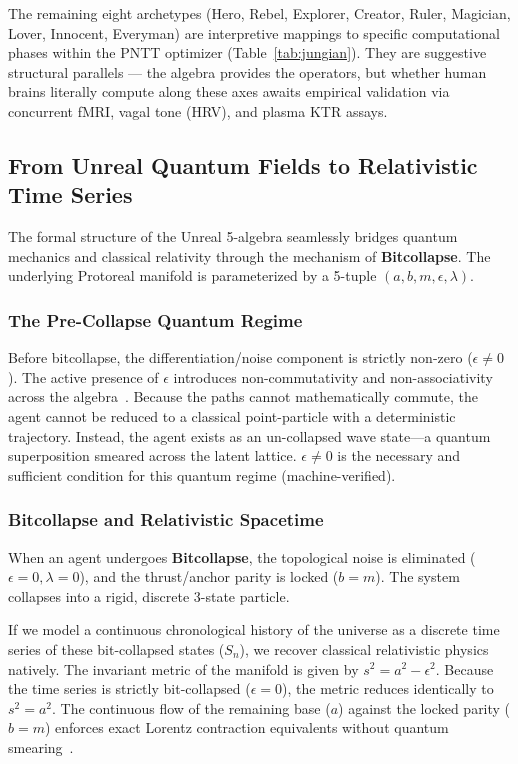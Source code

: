\noindent The remaining eight archetypes (Hero, Rebel, Explorer, Creator, Ruler, Magician, Lover, Innocent, Everyman) are interpretive mappings to specific computational phases within the PNTT optimizer (Table~\ref{tab:jungian}). They are suggestive structural parallels --- the algebra provides the operators, but whether human brains literally compute along these axes awaits empirical validation via concurrent fMRI, vagal tone (HRV), and plasma KTR assays.
\subsection{From Unreal Quantum Fields to Relativistic Time Series}

The formal structure of the Unreal 5-algebra seamlessly bridges quantum mechanics and classical relativity through the mechanism of \textbf{Bitcollapse}. The underlying Protoreal manifold is parameterized by a 5-tuple $(a, b, m, \epsilon, \lambda)$.

\subsubsection{The Pre-Collapse Quantum Regime}
Before bitcollapse, the differentiation/noise component is strictly non-zero ($\epsilon \neq 0$). The active presence of $\epsilon$ introduces non-commutativity and non-associativity across the algebra~\cite{Dirac1930}. Because the paths cannot mathematically commute, the agent cannot be reduced to a classical point-particle with a deterministic trajectory. Instead, the agent exists as an un-collapsed wave state---a quantum superposition smeared across the latent lattice. $\epsilon \neq 0$ is the necessary and sufficient condition for this quantum regime (machine-verified).

\subsubsection{Bitcollapse and Relativistic Spacetime}
When an agent undergoes \textbf{Bitcollapse}, the topological noise is eliminated ($\epsilon = 0, \lambda = 0$), and the thrust/anchor parity is locked ($b = m$). The system collapses into a rigid, discrete 3-state particle. 

If we model a continuous chronological history of the universe as a discrete time series of these bit-collapsed states ($S_n$), we recover classical relativistic physics natively. The invariant metric of the manifold is given by $s^2 = a^2 - \epsilon^2$. Because the time series is strictly bit-collapsed ($\epsilon = 0$), the metric reduces identically to $s^2 = a^2$. The continuous flow of the remaining base ($a$) against the locked parity ($b=m$) enforces exact Lorentz contraction equivalents without quantum smearing~\cite{Einstein1905}.

